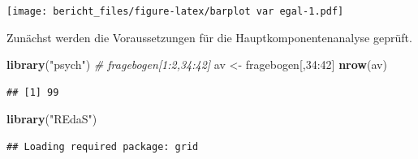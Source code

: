 \documentclass[]{article}
\newenvironment{Shaded}{\begin{snugshade}}{\end{snugshade}}
\newcommand{\KeywordTok}[1]{\textcolor[rgb]{0.13,0.29,0.53}{\textbf{{#1}}}}
\newcommand{\DataTypeTok}[1]{\textcolor[rgb]{0.13,0.29,0.53}{{#1}}}
\newcommand{\DecValTok}[1]{\textcolor[rgb]{0.00,0.00,0.81}{{#1}}}
\newcommand{\StringTok}[1]{\textcolor[rgb]{0.31,0.60,0.02}{{#1}}}
\newcommand{\CommentTok}[1]{\textcolor[rgb]{0.56,0.35,0.01}{\textit{{#1}}}}
\newcommand{\NormalTok}[1]{{#1}}
\begin{document}
\begin{Shaded}
\end{Shaded}

\texttt{[image: bericht\_files/figure-latex/barplot var egal-1.pdf]}

Zunächst werden die Voraussetzungen für die Hauptkomponentenanalyse
geprüft.

\begin{Shaded}
\begin{Highlighting}[]
\KeywordTok{library}\NormalTok{(}\StringTok{"psych"}\NormalTok{)}
\CommentTok{# fragebogen[1:2,34:42]}
\NormalTok{av <-}\StringTok{ }\NormalTok{fragebogen[,}\DecValTok{34}\NormalTok{:}\DecValTok{42}\NormalTok{]}
\KeywordTok{nrow}\NormalTok{(av)}
\end{Highlighting}
\end{Shaded}

\begin{verbatim}
## [1] 99
\end{verbatim}

\begin{Shaded}
\begin{Highlighting}[]
\KeywordTok{library}\NormalTok{(}\StringTok{"REdaS"}\NormalTok{)}
\end{Highlighting}
\end{Shaded}

\begin{verbatim}
## Loading required package: grid
\end{verbatim}
\end{document}
